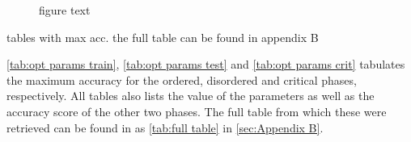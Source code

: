 \begin{figure}[H]
\qquad
{}
\qquad
{}
\caption{figure text}
\label{fig:gd_acc_lambda}
\end{figure}

tables with max acc. the full table can be found in appendix B

\autoref{tab:opt params train}, \autoref{tab:opt params test} and \autoref{tab:opt params crit} tabulates the maximum accuracy for the ordered, disordered and critical phases, respectively. All tables also lists the value of the parameters as well as the accuracy score of the other two phases. The full table from which these were retrieved can be found in as \autoref{tab:full table} in \autoref{sec:Appendix B}.

